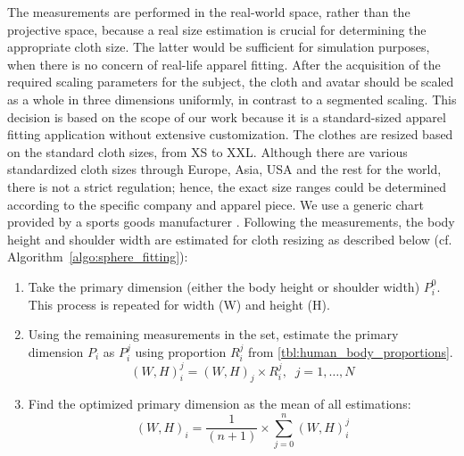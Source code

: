 \documentclass[number,preprint,review,12pt]{elsarticle}
\begin{document}
The measurements are performed in the real-world space, rather than the projective space, because a real size estimation is crucial for determining the appropriate cloth size. The latter would be sufficient for simulation purposes, when there is no concern of real-life apparel fitting. After the acquisition of the required scaling parameters for the subject, the cloth and avatar should be scaled as a whole in three dimensions uniformly, in contrast to a segmented scaling. This decision is based on the scope of our work because it is a standard-sized apparel fitting application without extensive customization. 
{\color{red}
The clothes are resized based on the standard cloth sizes, from XS to XXL. Although there are various standardized cloth sizes through Europe, Asia, USA and the rest for the world, there is not a strict regulation; hence, the exact size ranges could be determined according to the specific company and apparel piece. We use a generic chart provided by a sports goods manufacturer \cite{SKINS2013}.
}
Following the measurements, the body height and shoulder width are estimated for cloth resizing as described below (cf. Algorithm~\ref{algo:sphere_fitting}):

\clearpage

\begin{enumerate}
\item Take the primary dimension (either the body height or shoulder width) $P_i^0$. This process is repeated for width (W) and height (H).
\item Using the remaining measurements in the set, estimate the primary dimension $P_i$ as $P_i^j$ using proportion $R_i^j$ from \ref{tbl:human_body_proportions}.
\begin{equation}
(W,H)_i^j=(W,H)_j \times R_i^j, \;\; j=1, \ldots, N
\label{eqn:proportion_estimation}
\end{equation}
\item Find the optimized primary dimension as the mean of all estimations:
\begin{equation}
(W,H)_i=\frac{1}{(n+1)} \times \sum\limits_{j=0}^n (W,H)_i^j
\label{eqn:optimized_parameter}
\end{equation}
\end{enumerate}

\singlespacing
\end{document}

